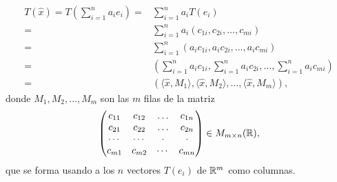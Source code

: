 \begin{itemize}
\begin{align*}
	T(\hat{x}) = 
	T\left( \sum_{i=1}^{n} a_{i}e_{i} \right) 
	= & \sum_{i=1}^{n} a_{i} T(e_{i})
	\\
	= &
	\sum_{i=1}^{n} a_{i}(c_{1i}, c_{2i}, \ldots, c_{mi}) \\ 
	= & \sum_{i=1}^{n}(a_{i}c_{1i}, a_{i} c_{2i}, \ldots , a_{i}c_{mi})\\
	= & \left( \sum_{i=1}^{n} a_{i}c_{1i},
	\sum_{i=1}^{n} a_{i}c_{2i}, \ldots , 
	\sum_{i=1}^{n} a_{i}c_{mi}  \right) \\
	= & \left(
	\langle \hat{x}, M_{1}\rangle, 	 
	\langle \hat{x}, M_{2}\rangle, \ldots ,
	\langle \hat{x}, M_{m}\rangle
	\right),
	\end{align*}
	donde $M_{1}, M_{2}, \ldots , M_{m}$ son las $m$
	filas de la matriz
	\[
	\begin{pmatrix}
	c_{11} & c_{12} & \ldots & c_{1n} \\
	c_{21} & c_{22} & \ldots & c_{2n} \\
	\cdots & \cdots & \cdot & \cdot \\
	c_{m1} & c_{m2} & \cdots & c_{mn}
	\end{pmatrix} \in M_{m \times n}(\mathbb{R}),
	\]
que se forma usando a los $n$ vectores $T(e_{i})$ de $\mathbb{R}^{m}$ 
como columnas.
\end{itemize}
\newpage